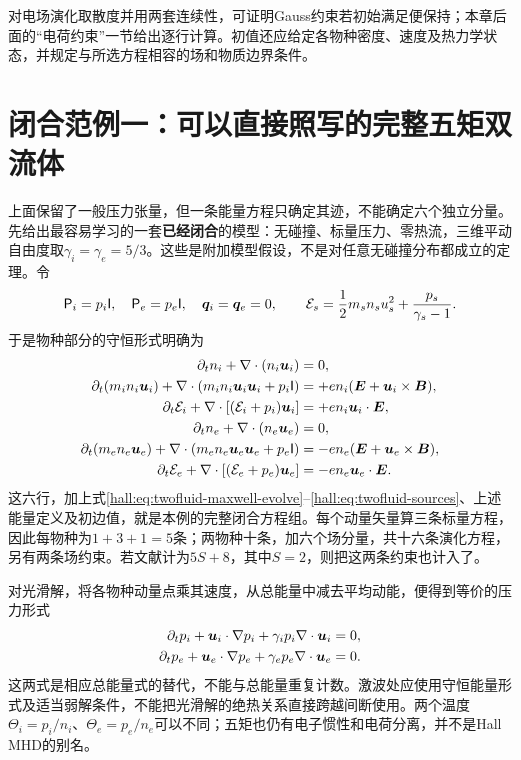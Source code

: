 对电场演化取散度并用两套连续性，可证明Gauss约束若初始满足便保持；本章后面的“电荷约束”一节给出逐行计算。初值还应给定各物种密度、速度及热力学状态，并规定与所选方程相容的场和物质边界条件。

\section{闭合范例一：可以直接照写的完整五矩双流体}
\label{hall:sec:full-five-moment}
上面保留了一般压力张量，但一条能量方程只确定其迹，不能确定六个独立分量。先给出最容易学习的一套\textbf{已经闭合}的模型：无碰撞、标量压力、零热流，三维平动自由度取$\gamma_i=\gamma_e=5/3$。这些是附加模型假设，不是对任意无碰撞分布都成立的定理。令
\begin{equation}
 \mathsf P_i=p_i\mathsf I,\quad \mathsf P_e=p_e\mathsf I,\quad
 \bm{q}_i=\bm{q}_e=0,\qquad
 \mathcal E_s=\frac12m_sn_su_s^2+\frac{p_s}{\gamma_s-1}.
\end{equation}
于是物种部分的守恒形式明确为
\begin{align}
 \partial_t n_i+\nabla\cdot(n_i\bm{u}_i)&=0,\\
 \partial_t(m_in_i\bm{u}_i)+\nabla\cdot(m_in_i\bm{u}_i\bm{u}_i+p_i\mathsf I)
 &=+en_i(\bm{E}+\bm{u}_i\times\bm{B}),\\
 \partial_t\mathcal E_i+\nabla\cdot[(\mathcal E_i+p_i)\bm{u}_i]
 &=+en_i\bm{u}_i\cdot\bm{E},\\
 \partial_t n_e+\nabla\cdot(n_e\bm{u}_e)&=0,\\
 \partial_t(m_en_e\bm{u}_e)+\nabla\cdot(m_en_e\bm{u}_e\bm{u}_e+p_e\mathsf I)
 &=-en_e(\bm{E}+\bm{u}_e\times\bm{B}),\\
 \partial_t\mathcal E_e+\nabla\cdot[(\mathcal E_e+p_e)\bm{u}_e]
 &=-en_e\bm{u}_e\cdot\bm{E}.
 \label{hall:eq:closed-five-species}
\end{align}
这六行，加上式\eqref{hall:eq:twofluid-maxwell-evolve}--\eqref{hall:eq:twofluid-sources}、上述能量定义及初边值，就是本例的完整闭合方程组。每个动量矢量算三条标量方程，因此每物种为$1+3+1=5$条；两物种十条，加六个场分量，共十六条演化方程，另有两条场约束。若文献计为$5S+8$，其中$S=2$，则把这两条约束也计入了。

对光滑解，将各物种动量点乘其速度，从总能量中减去平均动能，便得到等价的压力形式
\begin{align}
 \partial_t p_i+\bm{u}_i\cdot\nabla p_i+\gamma_i p_i\nabla\cdot\bm{u}_i&=0,\\
 \partial_t p_e+\bm{u}_e\cdot\nabla p_e+\gamma_e p_e\nabla\cdot\bm{u}_e&=0.
 \label{hall:eq:twofluid-adiabatic}
\end{align}
这两式是相应总能量式的替代，不能与总能量重复计数。激波处应使用守恒能量形式及适当弱解条件，不能把光滑解的绝热关系直接跨越间断使用。两个温度
$\Theta_i=p_i/n_i$、$\Theta_e=p_e/n_e$可以不同；五矩也仍有电子惯性和电荷分离，并不是Hall MHD的别名。

